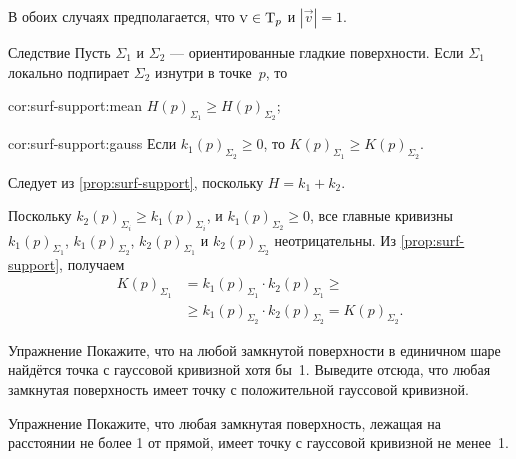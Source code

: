 В обоих случаях предполагается, что $\text{\sc{v}}\in\mathrm{T}_p$ и $|\vec v|=1$.\qeds



\begin{thm}{Следствие}\label{cor:surf-support}
Пусть $\Sigma_1$ и $\Sigma_2$ --- ориентированные гладкие поверхности.
Если $\Sigma_1$ локально подпирает $\Sigma_2$ изнутри в точке~$p$, то

\begin{subthm}{cor:surf-support:mean}
$H(p)_{\Sigma_1}\ge H(p)_{\Sigma_2}$;
\end{subthm}

\begin{subthm}{cor:surf-support:gauss}
Если $k_1(p)_{\Sigma_2}\ge 0$, то $K(p)_{\Sigma_1}\ge K(p)_{\Sigma_2}$.
\end{subthm}
 
\end{thm}



Следует из \ref{prop:surf-support}, поскольку $H=k_1+k_2$. 



Поскольку $k_2(p)_{\Sigma_i}\ge k_1(p)_{\Sigma_i}$, и $k_1(p)_{\Sigma_2}\ge 0$, все главные кривизны 
$k_1(p)_{\Sigma_1}$, 
$k_1(p)_{\Sigma_2}$, 
$k_2(p)_{\Sigma_1}$ и 
$k_2(p)_{\Sigma_2}$ неотрицательны.
Из \ref{prop:surf-support}, получаем
\begin{align*}
K(p)_{\Sigma_1}&=k_1(p)_{\Sigma_1}\cdot k_2(p)_{\Sigma_1}\ge 
\\
&\ge k_1(p)_{\Sigma_2}\cdot k_2(p)_{\Sigma_2}=K(p)_{\Sigma_2}.
\end{align*}
\qedsf

\begin{thm}{Упражнение}\label{ex:positive-gauss-0}
Покажите, что на любой замкнутой поверхности в единичном шаре найдётся точка с гауссовой кривизной хотя бы~1.
Выведите отсюда, что любая замкнутая поверхность имеет точку с положительной гауссовой кривизной.
\end{thm}

{\sloppy

\begin{thm}{Упражнение}\label{ex:positive-gauss}
Покажите, что любая замкнутая поверхность, лежащая на расстоянии не более 1 от прямой, имеет точку с гауссовой кривизной не менее~1.
\end{thm}

}

